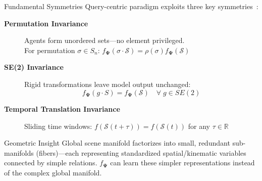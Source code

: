 \documentclass[10pt,aspectratio=169]{beamer}
\begin{document}
\begin{frame}{Fundamental Symmetries}
Query-centric paradigm exploits three key symmetries~\cite{qcnetZhou2023}:

\vspace{0.3cm}

\begin{description}
\item[\textbf{Permutation Invariance}]
Agents form unordered sets—no element privileged.\\ For permutation $\sigma \in S_n$: $f_{\boldsymbol{\Psi}}(\sigma \cdot \mathcal{S}) = \rho(\sigma) f_{\boldsymbol{\Psi}}(\mathcal{S})$

\item[\textbf{SE(2) Invariance}]
Rigid transformations leave model output unchanged:
\begin{equation}
f_{\boldsymbol{\Psi}}(g \cdot S) = f_{\boldsymbol{\Psi}}(\mathcal{S}) \quad \forall\; g \in SE(2)
\end{equation}

\item[\textbf{Temporal Translation Invariance}]
Sliding time windows: $f(\mathcal{S}(t+\tau)) = f(\mathcal{S}(t))$ for any $\tau \in \mathbb{R}$
\end{description}

\begin{block}{Geometric Insight}
Global scene manifold factorizes into small, redundant sub-manifolds (fibers)—each representing standardized spatial/kinematic variables connected by simple relations. $ f_{\boldsymbol{\Psi}}$ can learn these simpler representations instead of the complex global manifold.
\end{block}
\end{frame}
\end{document}
